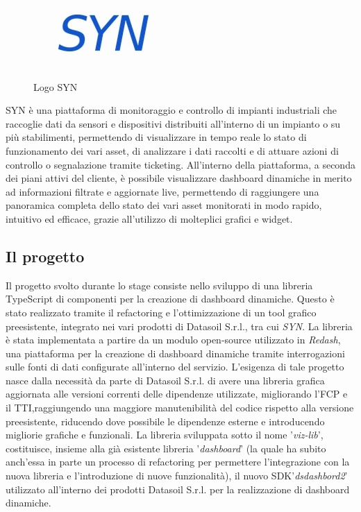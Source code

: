 \begin{figure}[H]
      \centering
      \includegraphics[alt={Logo SYN}, width=0.25\columnwidth]{img/syn_logo.jpg}
      \caption{Logo SYN}
      \label{fig:syn}
\end{figure}

SYN è una piattaforma di monitoraggio e controllo di impianti industriali che raccoglie dati da sensori e dispositivi
distribuiti all'interno di un impianto o su più stabilimenti, permettendo di visualizzare in tempo reale lo stato di
funzionamento dei vari asset, di analizzare i dati raccolti e di attuare azioni di controllo o segnalazione tramite
ticketing. All'interno della piattaforma, a seconda dei piani attivi del cliente, è possibile visualizzare dashboard dinamiche
in merito ad informazioni filtrate e aggiornate live, permettendo di raggiungere una panoramica completa dello stato dei vari
asset monitorati in modo rapido, intuitivo ed efficace, grazie all'utilizzo di molteplici grafici e widget.

\subsection{Il progetto}
Il progetto svolto durante lo stage consiste nello sviluppo di una libreria TypeScript di componenti per la creazione di dashboard dinamiche.
Questo è stato realizzato tramite il refactoring e l'ottimizzazione di un tool grafico preesistente, integrato nei vari prodotti di Datasoil S.r.l.,
tra cui \textit{SYN}. La libreria è stata implementata a partire da un modulo open-source utilizzato in \textit{Redash},
una piattaforma per la creazione di dashboard dinamiche tramite interrogazioni sulle fonti di dati configurate all'interno del servizio. \newline
L'esigenza di tale progetto nasce dalla necessità da parte di Datasoil S.r.l. di avere una libreria grafica aggiornata alle versioni
correnti delle dipendenze utilizzate, migliorando l'FCP e il TTI,raggiungendo una maggiore manutenibilità del codice rispetto alla versione
preesistente, riducendo dove possibile le dipendenze esterne e introducendo migliorie grafiche e funzionali. \newline
La libreria sviluppata sotto il nome '\textit{viz-lib}', costituisce, insieme alla già esistente libreria '\textit{dashboard}' (la quale ha subito anch'essa in parte un processo di refactoring
per permettere l'integrazione con la nuova libreria e l'introduzione di nuove funzionalità), il nuovo \gls{SDK}\glox '\textit{dsdashbord2}'
utilizzato all'interno dei prodotti Datasoil S.r.l. per la realizzazione di dashboard dinamiche.

